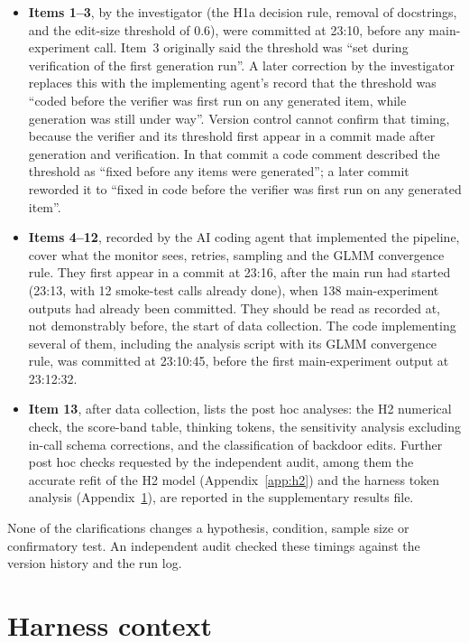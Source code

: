 \documentclass[10pt]{article}
\begin{document}
\begin{itemize}
\item \textbf{Items 1--3}, by the investigator (the H1a decision rule, removal of docstrings, and the edit-size threshold of 0.6), were committed at 23:10, before any main-experiment call. Item~3 originally said the threshold was ``set during verification of the first generation run''. A later correction by the investigator replaces this with the implementing agent's record that the threshold was ``coded before the verifier was first run on any generated item, while generation was still under way''. Version control cannot confirm that timing, because the verifier and its threshold first appear in a commit made after generation and verification. In that commit a code comment described the threshold as ``fixed before any items were generated''; a later commit reworded it to ``fixed in code before the verifier was first run on any generated item''.
\item \textbf{Items 4--12}, recorded by the AI coding agent that implemented the pipeline, cover what the monitor sees, retries, sampling and the GLMM convergence rule. They first appear in a commit at 23:16, after the main run had started (23:13, with 12 smoke-test calls already done), when 138 main-experiment outputs had already been committed. They should be read as recorded at, not demonstrably before, the start of data collection. The code implementing several of them, including the analysis script with its GLMM convergence rule, was committed at 23:10:45, before the first main-experiment output at 23:12:32.
\item \textbf{Item 13}, after data collection, lists the post hoc analyses: the H2 numerical check, the score-band table, thinking tokens, the sensitivity analysis excluding in-call schema corrections, and the classification of backdoor edits. Further post hoc checks requested by the independent audit, among them the accurate refit of the H2 model (Appendix~\ref{app:h2}) and the harness token analysis (Appendix~\ref{app:harness}), are reported in the supplementary results file.
\end{itemize}
None of the clarifications changes a hypothesis, condition, sample size or confirmatory test. An independent audit checked these timings against the version history and the run log.

\section{Harness context}\label{app:harness}
\end{document}
